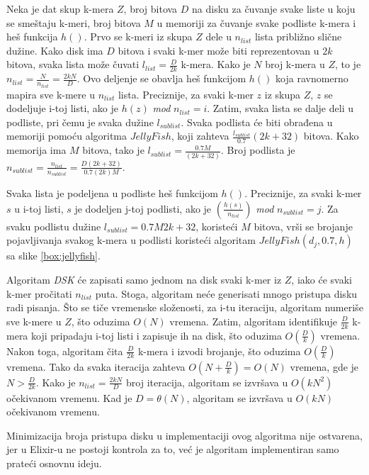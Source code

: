 \documentclass[12pt,oneside]{memoir}
\begin{document}
Neka je dat skup k-mera $Z$, broj bitova $D$ na disku za čuvanje svake liste u koju se smeštaju k-meri, broj bitova $M$ u memoriji za čuvanje svake podliste k-mera i heš funkcija $h()$. Prvo se k-meri iz skupa $Z$ dele u $n_{list}$ lista približno slične dužine. Kako disk ima $D$ bitova i svaki k-mer može biti reprezentovan u $2k$ bitova, svaka lista može čuvati $l_{list} =  \frac{D}{2k}$ k-mera. Kako je $N$ broj k-mera u $Z$, to je $n_{list} = \frac{N}{n_{list}} = \frac{2kN}{D}$. Ovo deljenje se obavlja heš funkcijom $h()$ koja ravnomerno mapira sve k-mere u $n_{list}$ lista. Preciznije, za svaki k-mer $z$ iz skupa $Z$, $z$ se dodeljuje i-toj listi, ako je $h(z)$ \textit{mod} $n_{list} = i$. Zatim, svaka lista se dalje deli u podliste, pri čemu je svaka dužine $l_{sublist}$. Svaka podlista će biti obrađena u memoriji pomoću algoritma $JellyFish$, koji zahteva $\frac{l_{sublist}}{0.7}(2k +32)$ bitova. Kako memorija ima $M$ bitova, tako je $l_{sublist} = \frac{0.7M}{(2k + 32)}$. Broj podlista je  $n_{sublist} = \frac{n_{list}}{n_{sublist}} = \frac{D(2k + 32)}{0.7(2k)M}$. 

Svaka lista je podeljena u podliste heš funkcijom $h()$. Preciznije, za svaki k-mer $s$ u i-toj listi, $s$ je dodeljen j-toj podlisti, ako je $(\frac{h(s)}{n_{list}})$ \textit{mod} $n_{sublist} = j$. Za svaku podlistu dužine $l_{sublist} = {0.7M}{2k + 32}$, koristeći $M$ bitova,  vrši se brojanje pojavljivanja svakog k-mera u podlisti koristeći algoritam $JellyFish(d_j, 0.7, h)$ sa slike \ref{box:jellyfish}.

Algoritam \textit{DSK} će zapisati samo jednom na disk svaki k-mer iz $Z$, iako će svaki k-mer pročitati $n_{list}$ puta. Stoga, algoritam neće generisati mnogo pristupa disku radi pisanja. Što se tiče vremenske složenosti, za i-tu iteraciju, algoritam numeriše sve k-mere u $Z$, što oduzima $O(N)$ vremena. Zatim, algoritam identifikuje $\frac{D}{2k}$ k-mera koji pripadaju i-toj listi i zapisuje ih na disk, što oduzima $O(\frac{D}{k})$ vremena. Nakon toga, algoritam  čita $\frac{D}{2k}$ k-mera i izvodi brojanje, što oduzima $O(\frac{D}{k})$ vremena. Tako da svaka iteracija zahteva $O(N + \frac{D}{k}) = O(N)$ vremena, gde je $N > \frac{D}{2k}$. Kako je $n_{list} = \frac{2kN}{D}$ broj iteracija, algoritam se izvršava u $O(kN^2)$ očekivanom vremenu. Kad je $D = \theta(N)$, algoritam se izvršava u $O(kN)$ očekivanom vremenu.

Minimizacija broja pristupa disku u implementaciji ovog algoritma nije ostvarena, jer u Elixir-u ne postoji kontrola za to, već je algoritam implementiran samo prateći osnovnu ideju.
\end{document}
